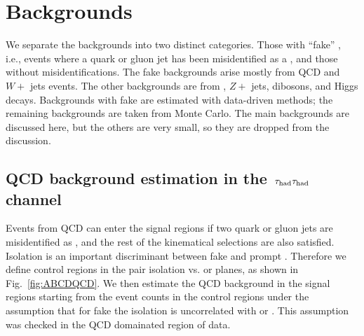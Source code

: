 \section{Backgrounds}
\label{sect:bkgLepTau}
We separate the backgrounds into two distinct categories.  Those with 
``fake'' \Tau, i.e., events where a quark or gluon jet has been misidentified
as a \Tau, and those without \Tau misidentifications.  
The fake \Tau backgrounds arise mostly from QCD and $W+$ jets events.  The 
other backgrounds are from \ttbar, $Z+$ jets, dibosons, and Higgs decays.
Backgrounds with fake \Tau are estimated with data-driven methods; the 
remaining backgrounds are taken from Monte Carlo. The main backgrounds
are discussed here, but the others are very small, so they are dropped from the 
discussion.


\subsection{\texorpdfstring{QCD background estimation in the $\,\tau_{\rm had}\tau_{\rm had}$ channel}{QCD background estimation in the tau-tau channel}}

Events from QCD can enter the signal regions if two quark or gluon jets are 
misidentified as \Tau, and the rest of the kinematical selections are also 
satisfied.  Isolation is an important 
discriminant between fake \Tau and prompt \Tau.
Therefore we define control regions in the 
\Tau pair isolation vs. \mttwo or \SumMT 
planes, as shown in Fig.~\ref{fig:ABCDQCD}. We then estimate the QCD background
in the signal regions starting from the event counts in the
control regions under the assumption
that for fake \tauTau the isolation is uncorrelated with \mttwo or \SumMT.
This assumption was checked in the QCD domainated region of data.

